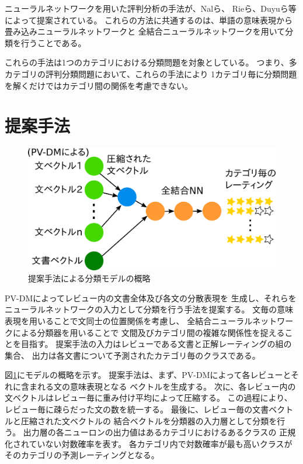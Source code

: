 \documentclass{ttisummary}
\makeatletter
\let\tti@includegraphics\includegraphics
\renewcommand{\includegraphics}[1]{\tti@includegraphics[width=\linewidth]{#1}}
\makeatother
\begin{document}
ニューラルネットワークを用いた評判分析の手法が、Nalら\cite{nal14}、
Rieら\cite{rie14}、Duyuら\cite{duyu15}等によって提案されている。
これらの方法に共通するのは、単語の意味表現から畳み込みニューラルネットワークと
全結合ニューラルネットワークを用いて分類を行うことである。

これらの手法は1つのカテゴリにおける分類問題を対象としている。
つまり、多カテゴリの評判分類問題において、これらの手法により
1カテゴリ毎に分類問題を解くだけではカテゴリ間の関係を考慮できない。



\section{提案手法}

\begin{figure}[t!]
  \includegraphics{fig/model.png}
  \caption{提案手法による分類モデルの概略}
  \label{fig:MyModel}
\end{figure}

PV-DMによってレビュー内の文書全体及び各文の分散表現を
生成し、それらをニューラルネットワークの入力として分類を行う手法を提案する。
文毎の意味表現を用いることで文同士の位置関係を考慮し、
全結合ニューラルネットワークによる分類器を用いることで
文間及びカテゴリ間の複雑な関係性を捉えることを目指す。
提案手法の入力はレビューである文書と正解レーティングの組の集合、
出力は各文書について予測されたカテゴリ毎のクラスである。

図\ref{fig:MyModel}にモデルの概略を示す。
提案手法は、まず、PV-DMによって各レビューとそれに含まれる文の意味表現となる
ベクトルを生成する。
次に、各レビュー内の文ベクトルはレビュー毎に重み付け平均によって圧縮する。
この過程により、レビュー毎に疎らだった文の数を統一する。
最後に、レビュー毎の文書ベクトルと圧縮された文ベクトルの
結合ベクトルを分類器の入力層として分類を行う。
出力層の各ニューロンの出力値はあるカテゴリにおけるあるクラスの
正規化されていない対数確率を表す。
各カテゴリ内で対数確率が最も高いクラスがそのカテゴリの予測レーティングとなる。
\end{document}
